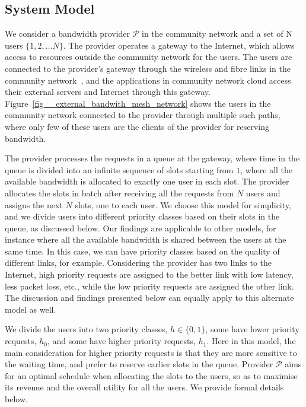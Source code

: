 
\subsection{System Model}
\label{sec:model}

We consider a bandwidth provider $\mathcal{P}$ in the community network and a set of N users $\{1, 2, \ldots N\}$. %
The provider operates a gateway to the Internet, which allows access to resources outside the community network for the users.
The users are connected to the provider's gateway through the wireless and fibre links in the community network~\cite{Baig2015Guifi}, 
and the applications in community network cloud access their external servers and Internet through this gateway.
Figure~\ref{fig__external_bandwith_mesh_network} shows the users in the community network connected to the provider through multiple such paths, where only few of these users are the clients of the provider for reserving bandwidth.

The provider processes the requests in a queue at the gateway, where time in the queue is divided into an infinite sequence of slots starting from $1$, 
where all the available bandwidth is allocated to exactly one user in each slot.
The provider allocates the slots in batch after receiving all the requests from $N$ users and assigns the next $N$ slots, one to each user.
We choose this model for simplicity, and we divide users into different priority classes based on their slots in the queue, as discussed below.
Our findings are applicable to other models, for instance where all the available bandwidth is shared between the users at the same time.
In this case, we can have priority classes based on the quality of different links, for example.
Considering the provider has two links to the Internet, high priority requests are assigned to the better link with low latency, less packet loss, etc., 
while the low priority requests are assigned the other link.
The discussion and findings presented below can equally apply to this alternate model as well. 

We divide the users into two priority classes, $h \in \{0, 1\}$,
some have lower priority requests, $h_0$,
and some have higher priority requests, $h_1$.
Here in this model, the main consideration for higher priority requests is that they are more sensitive to the waiting time,
and prefer to reserve earlier slots in the queue.
Provider $\mathcal{P}$ aims for an optimal schedule when allocating the slots to the users, 
so as to maximise its revenue
and the overall utility for all the users.
We provide formal details below.

